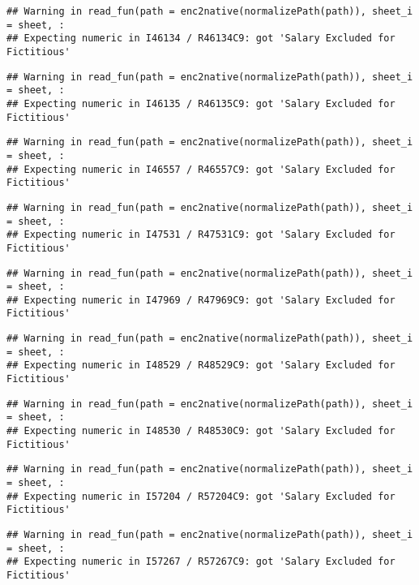 \documentclass[
]{article}
\begin{document}
\begin{verbatim}
## Warning in read_fun(path = enc2native(normalizePath(path)), sheet_i = sheet, :
## Expecting numeric in I46134 / R46134C9: got 'Salary Excluded for Fictitious'
\end{verbatim}

\begin{verbatim}
## Warning in read_fun(path = enc2native(normalizePath(path)), sheet_i = sheet, :
## Expecting numeric in I46135 / R46135C9: got 'Salary Excluded for Fictitious'
\end{verbatim}

\begin{verbatim}
## Warning in read_fun(path = enc2native(normalizePath(path)), sheet_i = sheet, :
## Expecting numeric in I46557 / R46557C9: got 'Salary Excluded for Fictitious'
\end{verbatim}

\begin{verbatim}
## Warning in read_fun(path = enc2native(normalizePath(path)), sheet_i = sheet, :
## Expecting numeric in I47531 / R47531C9: got 'Salary Excluded for Fictitious'
\end{verbatim}

\begin{verbatim}
## Warning in read_fun(path = enc2native(normalizePath(path)), sheet_i = sheet, :
## Expecting numeric in I47969 / R47969C9: got 'Salary Excluded for Fictitious'
\end{verbatim}

\begin{verbatim}
## Warning in read_fun(path = enc2native(normalizePath(path)), sheet_i = sheet, :
## Expecting numeric in I48529 / R48529C9: got 'Salary Excluded for Fictitious'
\end{verbatim}

\begin{verbatim}
## Warning in read_fun(path = enc2native(normalizePath(path)), sheet_i = sheet, :
## Expecting numeric in I48530 / R48530C9: got 'Salary Excluded for Fictitious'
\end{verbatim}

\begin{verbatim}
## Warning in read_fun(path = enc2native(normalizePath(path)), sheet_i = sheet, :
## Expecting numeric in I57204 / R57204C9: got 'Salary Excluded for Fictitious'
\end{verbatim}

\begin{verbatim}
## Warning in read_fun(path = enc2native(normalizePath(path)), sheet_i = sheet, :
## Expecting numeric in I57267 / R57267C9: got 'Salary Excluded for Fictitious'
\end{verbatim}
\end{document}
